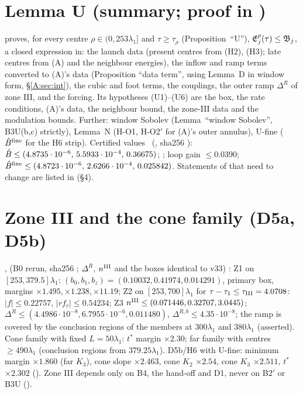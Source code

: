 \documentclass[11pt]{article}
\begin{document}


\section{Lemma U (summary; proof in )}\label{M:sec:U}
 proves, for every centre $\rho\in(0,253\lambda_1]$ and $\tau\ge\tau_\rho$ (Proposition~``U''), $\mathfrak E^\rho_j(\tau)\le\mathfrak B_j$, a closed expression in: the launch data (present centres from (H2), (H3); late centres from (A) and the neighbour energies), the inflow and ramp terms converted to (A)'s data (Proposition ``data term'', using Lemma~D in window form, \S\ref{A:sec:int}), the cubic and foot terms, the couplings, the outer ramp $\Delta^R$ of zone III, and the forcing. Its hypotheses (U1)--(U6) are the box, the rate conditions, (A)'s data, the neighbour bound, the zone-III data and the modulation bounds. Further: window Sobolev (Lemma~``window Sobolev'', B3U(b,c) strictly), Lemma~N (H-O1, H-O2$'$ for (A)'s outer annulus), U-fine ($\hat B^{\rm fine}$ for the H6 strip). Certified values \tC\ (, sha256 ): $\hat B\le(4.8735\cdot10^{-6},\,5.5933\cdot10^{-4},\,0.36675)$; \UmarV; loop gain $\le0.0390$; $\hat B^{\rm fine}\le(4.8723\cdot10^{-6},\,2.6266\cdot10^{-4},\,0.025842)$. Statements of  that need to change are listed in  (\S4).

\section{Zone III and the cone family (D5a, D5b)}\label{M:sec:zone3}
,  (B0 rerun, sha256 ; $\Delta^R$, $n^{\rm III}$ and the boxes identical to v33) \tC: Z1 on $[253,379.5]\lambda_1$: $(b_0,b_1,b_z)=(0.10032,0.41974,0.014291)$, primary box, margins $\times1.495,\times1.238,\times11.19$; Z2 on $[253,700]\lambda_1$ for $\tau-\tau_1\le\tau_{\rm III}=4.0708$: $|f|\le0.22757$, $|rf_r|\le0.54234$; Z3 $n^{\rm III}\le(0.071446,0.32707,3.0445)$; $\Delta^R\le(4.4986\cdot10^{-8},6.7955\cdot10^{-6},0.011480)$, $\Delta^{R,b}\le4.35\cdot10^{-8}$; the ramp is covered by the conclusion regions of the members at $300\lambda_1$ and $380\lambda_1$ (asserted). Cone family with fixed $L=50\lambda_1$: $t^*$ margin $\times2.30$; far family with centres $\ge490\lambda_1$ (conclusion regions from $379.25\lambda_1$). D5b/H6 with U-fine: minimum margin $\times1.860$ (far $K_3$), cone slope $\times2.463$, cone $K_2$ $\times2.54$, cone $K_3$ $\times2.511$, $t^*$ $\times2.302$ (). Zone III depends only on B4, the hand-off and D1, never on B2$'$ or B3U ().
\end{document}

